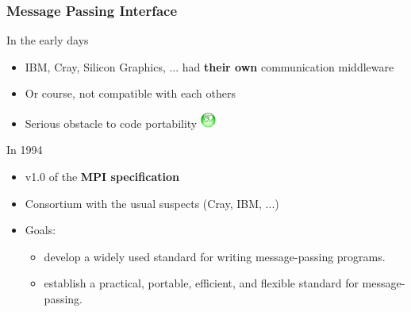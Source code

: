 \documentclass[xcolor={x11names,svgnames,psnames}]{beamer}
\newcommand{\triste}{\includegraphics[width=0.5cm,trim=0 17mm 0 0]{triste}}
\begin{document}
\begin{frame}
  \frametitle{Message Passing Interface}

  \begin{block}{In the early days}
    \begin{itemize}
    \item IBM, Cray, Silicon Graphics, ... had \textbf{their own} communication middleware
    \item Or course, \alert{not compatible} with each others
    \item Serious obstacle to code portability \triste
    \end{itemize}
  \end{block}

  \medskip
  
  \begin{exampleblock}{In 1994}
    \begin{itemize}
    \item v1.0 of the \textbf{MPI specification}
    \item Consortium with the usual suspects (Cray, IBM, ...)
    \item Goals:
      \begin{itemize}
      \item develop a widely used standard for writing message-passing programs.
      \item establish a practical, portable, efficient, and flexible standard
        for message-passing.
      \end{itemize}
    \end{itemize}
  \end{exampleblock}
\end{frame}

\end{document}
